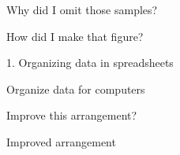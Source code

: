 \documentclass[12pt,t]{beamer}
\begin{document}
\begin{frame}[c]{}
\centerline{\Large Why did I omit those samples?}
\end{frame}



\begin{frame}[c]{}
\centerline{\Large How did I make that figure?}
\end{frame}



\begin{frame}[c]{1. Organizing data in spreadsheets}

\begin{center}
\large
Organize data for computers
\end{center}

\end{frame}


\begin{frame}{Improve this arrangement?}

\vspace{7mm}


\end{frame}




\begin{frame}{Improved arrangement}

\vspace{7mm}


\vspace{10mm}

\end{frame}
\end{document}
